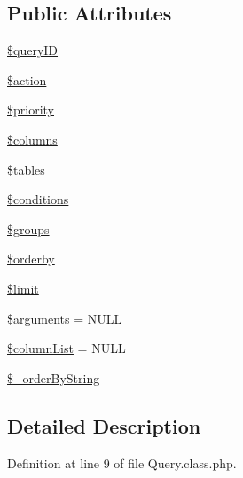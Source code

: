 \subsection*{Public Attributes}
\begin{DoxyCompactItemize}
\item 
\hyperlink{classQuery_a67666b2fcd6c60e73d8329f7d22044dc}{\$query\-I\-D}
\item 
\hyperlink{classQuery_a62c36010085369fc0508ea548660be9f}{\$action}
\item 
\hyperlink{classQuery_a4d64f61fd525a70ebc2aaa6ab8291e20}{\$priority}
\item 
\hyperlink{classQuery_a7cf97254cbd55fdbb9e149723498d9ba}{\$columns}
\item 
\hyperlink{classQuery_a5c74163d1615b141456b123c11fa9d92}{\$tables}
\item 
\hyperlink{classQuery_a5c71d786a82b2cc014968d2553b6bc9d}{\$conditions}
\item 
\hyperlink{classQuery_a76992fbfae6d700e65dfde28911a2475}{\$groups}
\item 
\hyperlink{classQuery_aa955216a83dfe57cdd9600b44b38ebac}{\$orderby}
\item 
\hyperlink{classQuery_abe481cf8b7f42b513a4f64cf7fb0ffea}{\$limit}
\item 
\hyperlink{classQuery_a49166e3c5f5198e4b899c8ee47b6258a}{\$arguments} = N\-U\-L\-L
\item 
\hyperlink{classQuery_a113bcdfdc3bf6acef684a06ae324334a}{\$column\-List} = N\-U\-L\-L
\item 
\hyperlink{classQuery_aaf035e5cfac7afe46163a6ba4c55c34b}{\$\-\_\-order\-By\-String}
\end{DoxyCompactItemize}


\subsection{Detailed Description}


Definition at line 9 of file Query.\-class.\-php.



